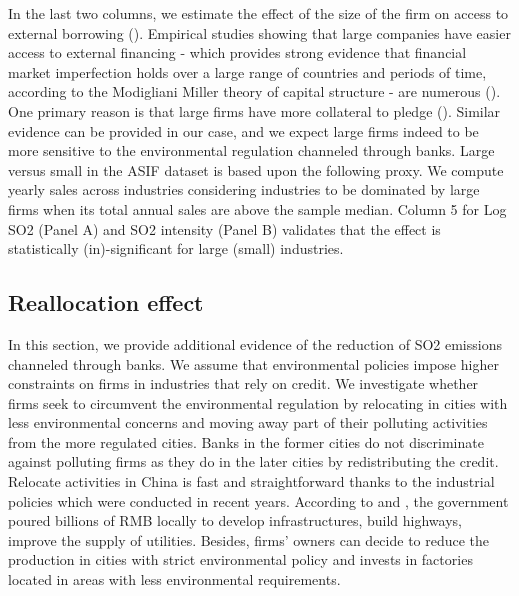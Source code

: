 \documentclass[12pt]{article}
\begin{document}
In the last two columns, we estimate the effect of the size of the firm on access to external borrowing (\cite{Beck2006-qy}). Empirical studies showing that large companies have easier access to external financing - which provides strong evidence that financial market imperfection holds over a large range of countries and periods of time, according to the Modigliani Miller theory of capital structure - are numerous (\cite{Modigliani1958-nu}). One primary reason is that large firms have more collateral to pledge (\cite{Andersen2015-pa}). Similar evidence can be provided in our case, and we expect large firms indeed to be more sensitive to the environmental regulation channeled through banks. Large versus small in the ASIF dataset is based upon the following proxy. We compute yearly sales across industries considering industries to be dominated by large firms when its total annual sales are above the sample median. Column 5 for Log SO2 (Panel A) and SO2 intensity (Panel B) validates that the effect is statistically (in)-significant for large (small) industries.

\subsection{Reallocation effect}

In this section, we provide additional evidence of the reduction of SO2 emissions channeled through banks. We assume that environmental policies impose higher constraints on firms in industries that rely on credit. We investigate whether firms seek to circumvent the environmental regulation by relocating in cities with less environmental concerns and moving away part of their polluting activities from the more regulated cities. Banks in the former cities do not discriminate against polluting firms as they do in the later cities by redistributing the credit. Relocate activities in China is fast and straightforward thanks to the industrial policies which were conducted in recent years. According to \cite{Wang2013-tb} and \cite{Alder2016-rl}, the government poured billions of RMB locally to develop infrastructures, build highways, improve the supply of utilities. Besides, firms’ owners can decide to reduce the production in cities with strict environmental policy and invests in factories located in areas with less environmental requirements.
\end{document}
